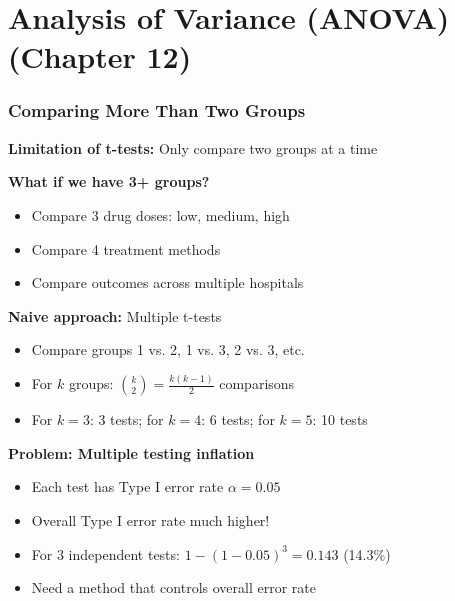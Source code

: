 \documentclass{beamer}
\begin{document}
\section{Analysis of Variance (ANOVA) (Chapter 12)}

\begin{frame}
\frametitle{Comparing More Than Two Groups}
\textbf{Limitation of t-tests:} Only compare two groups at a time

\vspace{0.3cm}
\textbf{What if we have 3+ groups?}
\begin{itemize}
\item Compare 3 drug doses: low, medium, high
\item Compare 4 treatment methods
\item Compare outcomes across multiple hospitals
\end{itemize}

\vspace{0.5cm}
\textbf{Naive approach:} Multiple t-tests
\begin{itemize}
\item Compare groups 1 vs. 2, 1 vs. 3, 2 vs. 3, etc.
\item For $k$ groups: $\binom{k}{2} = \frac{k(k-1)}{2}$ comparisons
\item For $k=3$: 3 tests; for $k=4$: 6 tests; for $k=5$: 10 tests
\end{itemize}

\vspace{0.5cm}
\textbf{Problem: Multiple testing inflation}
\begin{itemize}
\item Each test has Type I error rate $\alpha = 0.05$
\item Overall Type I error rate much higher!
\item For 3 independent tests: $1 - (1-0.05)^3 = 0.143$ (14.3\%)
\item Need a method that controls overall error rate
\end{itemize}
\end{frame}
\end{document}
